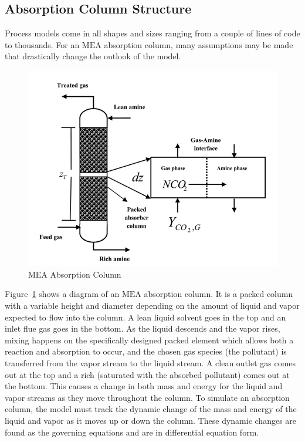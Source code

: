 \documentclass[12pt, letterpaper]{article}
\begin{document}
        \subsection{Absorption Column Structure}\label{subsec:absorption-column-structure}
            Process models come in all shapes and sizes ranging from a couple of lines of code to thousands.
            For an $\mathrm{MEA}$ absorption column, many assumptions may be made that drastically change the outlook of the model.
            \begin{figure}[ht]
                \centering
                \includegraphics[width=12cm]{MEA_Absorption_Column}
                \caption{MEA Absorption Column}\label{fig:MEA Absorption Column}
            \end{figure}
            Figure~\ref{fig:MEA Absorption Column} shows a diagram of an $\mathrm{MEA}$ absorption column.
            It is a packed column with a variable height and diameter depending on the amount of liquid and vapor expected to flow into the column.
            A lean liquid solvent goes in the top and an inlet flue gas goes in the bottom.
            As the liquid descends and the vapor rises, mixing happens on the specifically designed packed element which allows both a reaction and absorption to occur, and the chosen gas species (the pollutant) is transferred from the vapor stream to the liquid stream.
            A clean outlet gas comes out at the top and a rich (saturated with the absorbed pollutant) comes out at the bottom.
            This causes a change in both mass and energy for the liquid and vapor streams as they move throughout the column.
            To simulate an absorption column, the model must track the dynamic change of the mass and energy of the liquid and vapor as it moves up or down the column.
            These dynamic changes are found as the governing equations and are in differential equation form.
            
\end{document}
